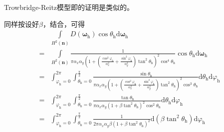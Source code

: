 Trowbridge-Reitz模型即的证明是类似的。
\begin{prove}
    同样按设好$\beta$，结合，可得
    \begin{align}
                                                                 & \int\limits_{H^2({\bm n})}D({\bm\omega}_{\mathrm{h}})\cos\theta_{\mathrm{h}}\mathrm{d}{\bm\omega}_{\mathrm{h}}\nonumber                                                                                                                                                                                                                                                            \\
        =                                                        & \int\limits_{H^2({\bm n})}\frac{1}{\pi\alpha_x\alpha_y\left(1+\left(\frac{\cos^2\varphi_{\mathrm{h}}}{\alpha_x^2}+\frac{\sin^2\varphi_{\mathrm{h}}}{\alpha_y^2}\right)\tan^2\theta_{\mathrm{h}}\right)^2\cos^4\theta_{\mathrm{h}}}\cos\theta_{\mathrm{h}}\mathrm{d}{\bm\omega}_{\mathrm{h}}\nonumber                                                                               \\
        =                                                        & \int_{\varphi_{\mathrm{h}}=0}^{2\pi}\int_{\theta_{\mathrm{h}}=0}^{\frac{\pi}{2}}\frac{\sin\theta_{\mathrm{h}}}{\pi\alpha_x\alpha_y\left(1+\left(\frac{\cos^2\varphi_{\mathrm{h}}}{\alpha_x^2}+\frac{\sin^2\varphi_{\mathrm{h}}}{\alpha_y^2}\right)\tan^2\theta_{\mathrm{h}}\right)^2\cos^3\theta_{\mathrm{h}}}\mathrm{d}\theta_{\mathrm{h}}\mathrm{d}\varphi_{\mathrm{h}}\nonumber \\
        =                                                        & \int_{\varphi_{\mathrm{h}}=0}^{2\pi}\int_{\theta_{\mathrm{h}}=0}^{\frac{\pi}{2}}\frac{\tan\theta_{\mathrm{h}}}{\pi\alpha_x\alpha_y(1+\beta\tan^2\theta_{\mathrm{h}})^2\cos^2\theta_{\mathrm{h}}}\mathrm{d}\theta_{\mathrm{h}}\mathrm{d}\varphi_{\mathrm{h}}\nonumber                                                                                                               \\
        =                                                        & \int_{\varphi_{\mathrm{h}}=0}^{2\pi}\int_{\theta_{\mathrm{h}}=0}^{\frac{\pi}{2}}\frac{1}{2\pi\alpha_x\alpha_y\beta(1+\beta\tan^2\theta_{\mathrm{h}})^2}\mathrm{d}(\beta\tan^2\theta_{\mathrm{h}})\mathrm{d}\varphi_{\mathrm{h}}\nonumber                                                                                                                                           \\

\end{align}
\end{prove}
